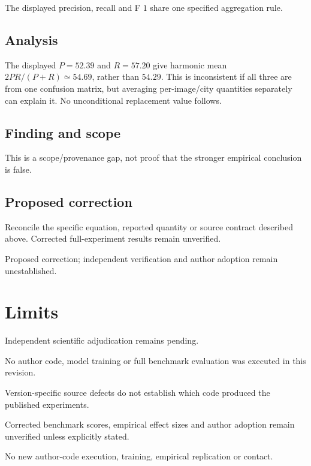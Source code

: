 \documentclass[11pt]{article}
\begin{document}
The displayed precision, recall and F \(1\) share one specified aggregation rule.

\subsection*{Analysis}

The displayed \(P=52.39\) and \(R=57.20\) give harmonic mean \(2PR/(P+R)\simeq54.69\), rather than \(54.29\). This is inconsistent if all three are from one confusion matrix, but averaging per-image/city quantities separately can explain it. No unconditional replacement value follows.

\subsection*{Finding and scope}

This is a scope/provenance gap, not proof that the stronger empirical conclusion is false.

\subsection*{Proposed correction}

Reconcile the specific equation, reported quantity or source contract described above. Corrected full-experiment results remain unverified.

Proposed correction; independent verification and author adoption remain unestablished.

\section*{Limits}

Independent scientific adjudication remains pending.\par

No author code, model training or full benchmark evaluation was executed in this revision.\par

Version-specific source defects do not establish which code produced the published experiments.\par

Corrected benchmark scores, empirical effect sizes and author adoption remain unverified unless explicitly stated.\par

No new author-code execution, training, empirical replication or contact.\par
\end{document}
